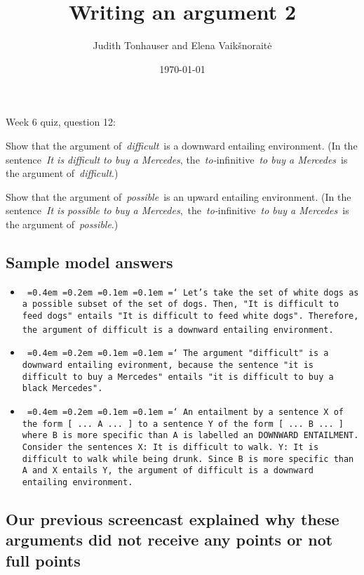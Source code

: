 \documentclass[a4,11pt]{article}
\title{Writing an argument 2}
\author{Judith Tonhauser and Elena Vaik\v snorait\.{e} }
\date{\today}
\newcommand*\justify{%
  \fontdimen2\font=0.4em%
  \fontdimen3\font=0.2em%
  \fontdimen4\font=0.1em%
  \fontdimen7\font=0.1em%
  \hyphenchar\font=`\-%
}
\begin{document}
\maketitle

Week 6 quiz, question 12:

Show that the argument of {\em difficult} is a downward entailing environment. (In the sentence {\em It is difficult to buy a Mercedes}, the {\em to-}infinitive {\em to buy a Mercedes} is the argument of {\em difficult}.)

Show that the argument of {\em possible} is an upward entailing environment. (In the sentence {\em It is possible to buy a Mercedes}, the {\em to-}infinitive {\em to buy a Mercedes} is the argument of {\em possible}.)

\subsection*{Sample model answers}

\begin{itemize}[leftmargin = 12pt]

\item \texttt{\justify Let's take the set of white dogs as a possible subset of the set of dogs. Then, "It is difficult to feed dogs" entails "It is difficult to feed white dogs". Therefore, the argument of difficult is a downward entailing environment.} 

\item \texttt{\justify The argument "difficult" is a downward entailing evironment, because the sentence "it is difficult to buy a Mercedes" entails "it is difficult to buy a black Mercedes".}

\item \texttt{\justify An entailment by a sentence X of the form [ ... A ... ] to a sentence Y of the form [ ... B ... ] where B is more specific than A is labelled an DOWNWARD ENTAILMENT. Consider the sentences X: It is difficult to walk. Y: It is difficult to walk while being drunk. Since B is more specific than A and X entails Y, the argument of difficult is a downward entailing environment.}

\end{itemize}

\subsection*{Our previous screencast explained why these arguments did not receive any points or not full points}
\end{document}
